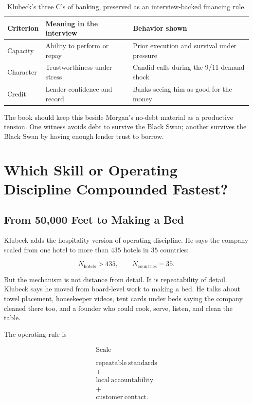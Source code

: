 \documentclass[11pt,oneside]{book}
\begin{document}
\begin{table}
\centering
\begin{tabular}{|p{.20\linewidth}|p{.36\linewidth}|p{.34\linewidth}|}
\hline
Criterion & Meaning in the interview & Behavior shown\\
\hline
Capacity & Ability to perform or repay & Prior execution and survival under pressure\\
\hline
Character & Trustworthiness under stress & Candid calls during the 9/11 demand shock\\
\hline
Credit & Lender confidence and record & Banks seeing him as good for the money\\
\hline
\end{tabular}
\caption{Klubeck's three C's of banking, preserved as an interview-backed financing rule.}
\end{table}

The book should keep this beside Morgan's no-debt material as a productive tension. One witness avoids debt to survive the Black Swan; another survives the Black Swan by having enough lender trust to borrow.

\chapter{Which Skill or Operating Discipline Compounded Fastest?}

\section{From 50,000 Feet to Making a Bed}

Klubeck adds the hospitality version of operating discipline. He says the company scaled from one hotel to more than \(435\) hotels in \(35\) countries:

\begin{equation}
N_{\mathrm{hotels}}>435,
\qquad
N_{\mathrm{countries}}=35.
\end{equation}

But the mechanism is not distance from detail. It is repeatability of detail. Klubeck says he moved from board-level work to making a bed. He talks about towel placement, housekeeper videos, tent cards under beds saying the company cleaned there too, and a founder who could cook, serve, listen, and clean the table.

The operating rule is

\begin{equation}
\begin{gathered}
\mathrm{Scale}\\
=\\
\mathrm{repeatable\ standards}\\
+\\
\mathrm{local\ accountability}\\
+\\
\mathrm{customer\ contact}.
\end{gathered}
\end{equation}
\end{document}
